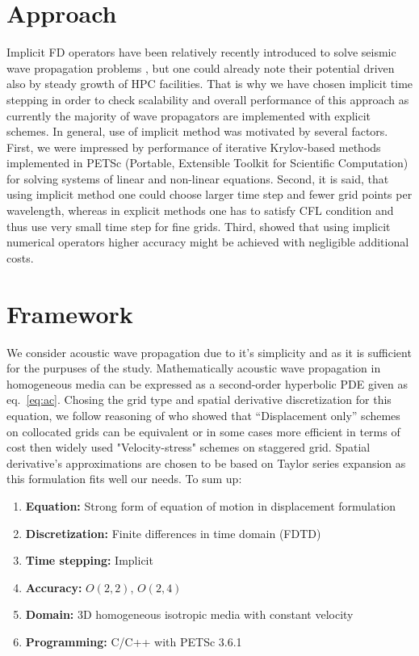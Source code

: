 \documentclass[12pt,a4paper]{report}
\begin{document}
\section*{Approach}
Implicit FD operators have been relatively recently introduced to solve seismic wave propagation problems \citep{liu2009practical, kosloff2010acoustic, chu2010frequency}, but one could already note their potential driven also by steady growth of HPC facilities. That is why we have chosen implicit time stepping in order to check scalability and overall performance of this approach as currently the majority of wave propagators are implemented with explicit schemes. In general, use of implicit method was motivated by several factors. First, we were impressed by performance of iterative Krylov-based methods implemented in PETSc (Portable, Extensible Toolkit for Scientific Computation) for solving systems of linear and non-linear equations. Second, it is said, that using implicit method one could choose larger time step and fewer grid points per wavelength, whereas in explicit methods one has to satisfy CFL condition and thus use very small time step for fine grids. Third, \citep{chu2012implicit, chu2010frequency}  showed that using implicit numerical operators higher accuracy might be achieved with negligible additional costs.\\

\section*{Framework}
We consider acoustic wave propagation due to it's simplicity and as it is sufficient for the purpuses of the study. Mathematically acoustic wave propagation in homogeneous media can be expressed as a second-order hyperbolic PDE given as eq.~\ref{eq:ac}. Chosing the grid type and spatial derivative discretization for this equation, we follow reasoning of \cite{geller2005comparison} who showed that “Displacement only” schemes on collocated grids can be equivalent or in some cases more efficient in terms of cost then widely used "Velocity-stress" schemes on staggered grid. Spatial derivative's approximations are chosen to be based on Taylor series expansion as this formulation fits well our needs. To sum up:
\begin{enumerate}
\item[] \textbf{Equation:} Strong form of equation of motion in displacement formulation
\item[] \textbf{Discretization:} Finite differences in time domain (FDTD)
\item[] \textbf{Time stepping:} Implicit
\item[] \textbf{Accuracy:} $O\left(2,2\right)$, $O\left(2,4\right)$
\item[] \textbf{Domain:} 3D homogeneous isotropic media with constant velocity
\item[] \textbf{Programming:} C/C++ with PETSc 3.6.1\\
\end{enumerate} 
\end{document}
